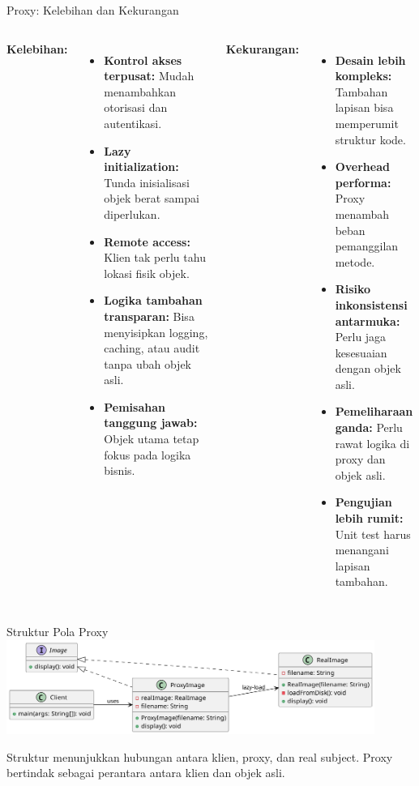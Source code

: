 \documentclass[aspectratio=169, table]{beamer}
\begin{document}
\begin{frame}{Proxy: Kelebihan dan Kekurangan}
	\vspace{20pt}
	\begin{columns}[T,onlytextwidth]
		\textbf{Kelebihan:}
		\begin{itemize}
			\item \textbf{Kontrol akses terpusat:} Mudah menambahkan otorisasi dan autentikasi.
			\item \textbf{Lazy initialization:} Tunda inisialisasi objek berat sampai diperlukan.
			\item \textbf{Remote access:} Klien tak perlu tahu lokasi fisik objek.
			\item \textbf{Logika tambahan transparan:} Bisa menyisipkan logging, caching, atau audit tanpa ubah objek asli.
			\item \textbf{Pemisahan tanggung jawab:} Objek utama tetap fokus pada logika bisnis.
		\end{itemize}
		
		\textbf{Kekurangan:}
		\begin{itemize}
			\item \textbf{Desain lebih kompleks:} Tambahan lapisan bisa memperumit struktur kode.
			\item \textbf{Overhead performa:} Proxy menambah beban pemanggilan metode.
			\item \textbf{Risiko inkonsistensi antarmuka:} Perlu jaga kesesuaian dengan objek asli.
			\item \textbf{Pemeliharaan ganda:} Perlu rawat logika di proxy dan objek asli.
			\item \textbf{Pengujian lebih rumit:} Unit test harus menangani lapisan tambahan.
		\end{itemize}
	\end{columns}
\end{frame}

\begin{frame}{Struktur Pola Proxy}
\vspace{10pt}
\centering
\includegraphics[width=0.9\textwidth]{../../figures/out/proxy.png}
\vspace{10pt}

\small Struktur menunjukkan hubungan antara klien, proxy, dan real subject. Proxy bertindak sebagai perantara antara klien dan objek asli.
\end{frame}
\end{document}
